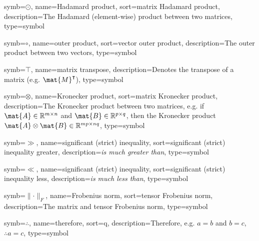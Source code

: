 {
    symb=\ensuremath{\odot},
name={Hadamard product},
sort={matrix Hadamard product},
description={The Hadamard (element-wise) product between two matrices},
type=symbol
}

{
    symb=\ensuremath{\circ},
name={outer product},
sort={vector outer product},
description={The outer product between two vectors},
type=symbol
}

{
    symb=\ensuremath{\intercal},
name={matrix transpose},
description={Denotes the transpose of a matrix (e.g. $\mat{M} ^ \intercal$)},
type=symbol
}

{
    symb=\ensuremath{\otimes},
name={Kronecker product},
sort={matrix Kronecker product},
description={The Kronecker product between two matrices, e.g. if $\mat{A} \in \mathbb{R} ^ {m \times n}$ and
    $\mat{B} \in \mathbb{R} ^ {p \times q}$, then the Kronecker product $\mat{A} \otimes \mat{B} \in \mathbb{R} ^ {mp \times nq}$},
type=symbol
}

{
    symb=\ensuremath{\gg},
name={significant (strict) inequality},
sort={significant (strict) inequality greater},
description={\emph{is much greater than}},
type=symbol
}

{
    symb=\ensuremath{\ll},
name={significant (strict) inequality},
sort={significant (strict) inequality less},
description={\emph{is much less than}},
type=symbol
}

{
    symb=\ensuremath{\lVert{\cdot}\rVert_F},
name={Frobenius norm},
sort={tensor Frobenius norm},
description={The matrix and tensor Frobenius norm},
type=symbol
}

{
    symb=\ensuremath{\therefore},
name={therefore},
sort={q},
description={Therefore, e.g. \ensuremath{a = b} and \ensuremath{b = c}, \ensuremath{\therefore a = c}},
type=symbol
}
